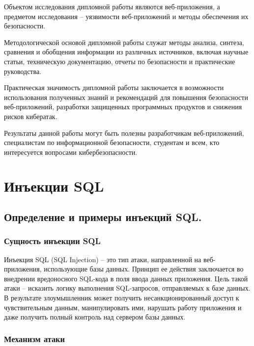 \documentclass[a4paper,12pt]{diplom}
\begin{document}
	Объектом исследования дипломной работы являются веб-приложения, а предметом исследования – уязвимости веб-приложений и методы обеспечения их безопасности.
	
	Методологической основой дипломной работы служат методы анализа, синтеза, сравнения и обобщения информации из различных источников, включая научные статьи, техническую документацию, отчеты по безопасности и практические руководства.
	
	Практическая значимость дипломной работы заключается в возможности использования полученных знаний и рекомендаций для повышения безопасности веб-приложений, разработки защищенных программных продуктов и снижения рисков кибератак. 
	
	Результаты данной работы могут быть полезны разработчикам веб-приложений, специалистам по информационной безопасности, студентам и всем, кто интересуется вопросами кибербезопасности.
	
	
	\chapter[Инъекции SQL]{Инъекции SQL}
	
	
	\section {Определение и примеры инъекций SQL.}
	
	
	\subsection{Сущность инъекции SQL}
	
	Инъекция SQL (SQL Injection) – это тип атаки, направленной на веб-приложения, использующие базы данных. Принцип ее действия заключается во внедрении вредоносного SQL-кода в поля ввода данных приложения. Цель такой атаки – исказить логику выполнения SQL-запросов, отправляемых к базе данных. В результате злоумышленник может получить несанкционированный доступ к чувствительным данным, манипулировать ими, нарушать работу приложения и даже получить полный контроль над сервером базы данных.
	
	
	\subsection{Механизм атаки}
	
\end{document}
